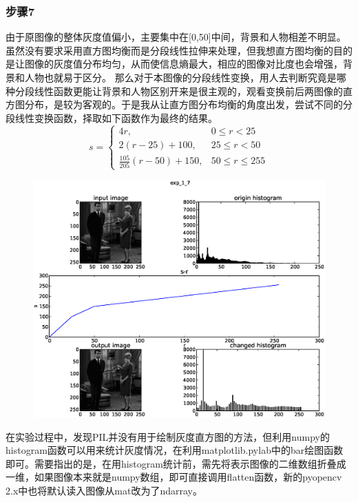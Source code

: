 \documentclass[]{IEEEphot}
\begin{document}
\subsubsection{步骤7}
由于原图像的整体灰度值偏小，主要集中在[0,50]中间，背景和人物相差不明显。虽然没有要求采用直方图均衡而是分段线性拉伸来处理，但我想直方图均衡的目的是让图像的灰度值分布均匀，从而使信息熵最大，相应的图像对比度也会增强，背景和人物也就易于区分。
那么对于本图像的分段线性变换，用人去判断究竟是哪种分段线性函数更能让背景和人物区别开来是很主观的，观看变换前后两图像的直方图分布，是较为客观的。于是我从让直方图分布均衡的角度出发，尝试不同的分段线性变换函数，择取如下函数作为最终的结果。
\begin{equation}
	s=\left\{
		\begin{array}{lr}
			4r,& 0\leq r<25\\
  2(r-25)+100, & 25\leq r<50\\
			\frac{105}{205}(r-50)+150, & 50\leq r\leq 255
		\end{array}
		\right.
		\label{eql}
	\end{equation}
\begin{figure}
\centering
\includegraphics[width=40pc]{exp_1_7.eps}\\
\label{fig_env2}
\end{figure}
在实验过程中，发现PIL并没有用于绘制灰度直方图的方法，但利用numpy的histogram函数可以用来统计灰度情况，在利用matplotlib.pylab中的bar绘图函数即可。需要指出的是，在用histogram统计前，需先将表示图像的二维数组折叠成一维，如果图像本来就是numpy数组，即可直接调用flatten函数，新的pyopencv 2.x中也将默认读入图像从mat改为了ndarray。
\end{document}
